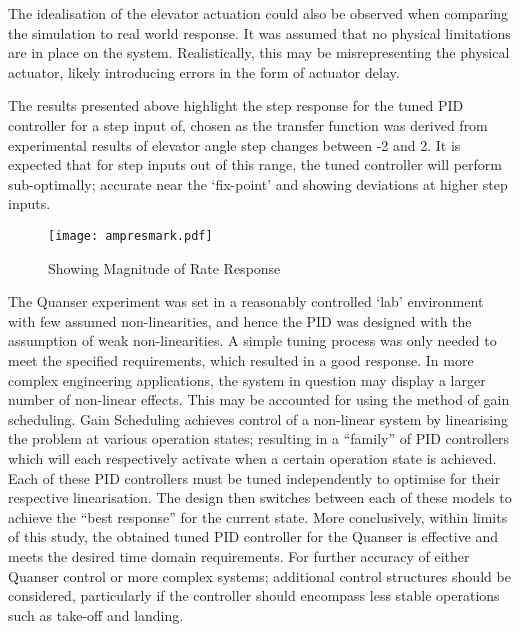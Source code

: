 The idealisation of the elevator actuation could also be observed when
comparing the simulation to real world response. It was assumed that no
physical limitations are in place on the system. Realistically, this may
be misrepresenting the physical actuator, likely introducing errors in
the form of actuator delay.

The results presented above highlight the step response for the tuned
PID controller for a step input of, chosen as the transfer function was
derived from experimental results of elevator angle step changes between
-2 and 2. It is expected that for step inputs out of this range, the
tuned controller will perform sub-optimally; accurate near the
`fix-point' and showing deviations at higher step inputs.

\begin{wrapfigure}{r}{0.45\textwidth}
\vspace{-10pt}
\centering
 \texttt{[image: ampresmark.pdf]}
\vspace{-5pt}
\caption{Showing Magnitude of Rate Response}
 \vspace{-20pt}
 \label{ampres}
\end{wrapfigure}

The Quanser experiment was set in a reasonably controlled `lab'
environment with few assumed non-linearities, and hence the PID was
designed with the assumption of weak non-linearities. A simple tuning
process was only needed to meet the specified requirements, which
resulted in a good response. In more complex engineering applications,
the system in question may display a larger number of non-linear
effects. This may be accounted for using the method of gain scheduling.
Gain Scheduling \cite{stackcont} achieves control of a non-linear system
by linearising the problem at various operation states; resulting in a
``family'' of PID controllers which will each respectively activate when
a certain operation state is achieved. Each of these PID controllers
must be tuned independently to optimise for their respective
linearisation. The design then switches between each of these models to
achieve the ``best response'' for the current state. More conclusively,
within limits of this study, the obtained tuned PID controller for the
Quanser is effective and meets the desired time domain requirements. For
further accuracy of either Quanser control or more complex systems;
additional control structures should be considered, particularly if the
controller should encompass less stable operations such as take-off and
landing.


